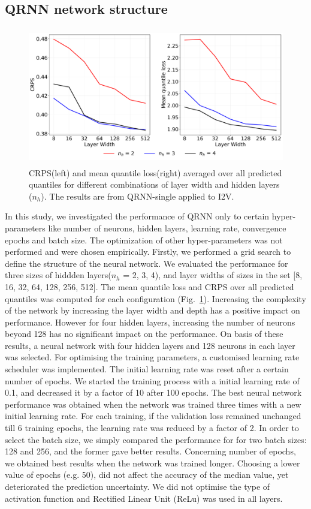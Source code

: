 \documentclass[amt, manuscript]{copernicus}
\begin{document}
\subsection{QRNN network structure}
%
\begin{figure}[t]
	\centering
	\includegraphics[height=60mm]{Figures/CRPS.pdf} 
	\caption{CRPS(left) and mean quantile loss(right) averaged over all predicted quantiles for different combinations of layer width and hidden layers ($n_h$). The results are from QRNN-single applied to I2V.}
	\label{fig:grid_search}	
\end{figure}
In this study, we investigated the performance of QRNN only to certain hyper-parameters like number of neurons, hidden layers, learning rate, convergence epochs and batch size. The optimization of other hyper-parameters was not performed and were chosen empirically. Firstly, we performed a grid search to define the structure of the neural network. We evaluated the performance for three sizes of hiddden layers($n_h$ = 2, 3, 4), and layer widths of sizes in the set [8, 16, 32, 64, 128, 256, 512]. The mean quantile loss and CRPS over all predicted quantiles was computed for each configuration (Fig.~\ref{fig:grid_search}). Increasing the complexity of the network by increasing the layer width and depth has a positive impact on performance. However for four hidden layers, increasing the number of neurons beyond 128 has no significant impact on the performance. On basis of these results, a neural network with four hidden layers and 128 neurons in each layer was selected. For optimising the training parameters, a customised  learning rate scheduler was implemented. The initial learning rate was reset after a certain number of epochs.  We started the training process with a initial learning rate of 0.1, and decreased it by a factor of 10 after 100 epochs. The best neural network performance was obtained when the network was trained three times with a new initial learning rate. For each training, if the validation loss remained unchanged till 6 training epochs, the learning rate was reduced by a factor of 2. 
In order to select the batch size, we simply compared the performance for for two batch sizes: 128 and 256, and the former gave better results. Concerning number of epochs, we obtained best results when the network was trained longer. Choosing a lower value of epochs (e.g. 50), did not affect the accuracy of the median value, yet deteriorated the prediction uncertainty. We did not optimise the type of activation function and Rectified Linear Unit (ReLu) was used in all layers. 
\end{document}
